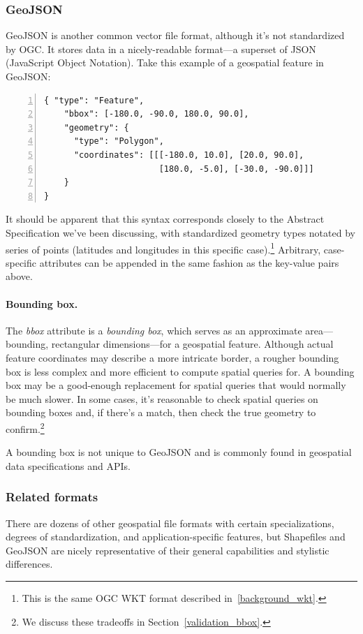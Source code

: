 \subsubsection{GeoJSON}
GeoJSON is another common vector file format, although it's not standardized by OGC. It stores data in a nicely-readable format---a superset of JSON (JavaScript Object Notation). Take this example of a geospatial feature in GeoJSON:

\begin{Verbatim}[samepage=true,baselinestretch=1,numbers=left,xleftmargin=12mm]
{ "type": "Feature",
    "bbox": [-180.0, -90.0, 180.0, 90.0],
    "geometry": {
      "type": "Polygon",
      "coordinates": [[[-180.0, 10.0], [20.0, 90.0],
                       [180.0, -5.0], [-30.0, -90.0]]]
    }
}
\end{Verbatim}

It should be apparent that this syntax corresponds closely to the Abstract Specification we've been discussing, with standardized geometry types notated by series of points (latitudes and longitudes in this specific case).\footnote{This is the same OGC WKT format described in~\ref{background_wkt}.} Arbitrary, case-specific attributes can be appended in the same fashion as the key-value pairs above.

\paragraph{Bounding box.}
The \textit{bbox} attribute is a \textit{bounding box}, which serves as an approximate area---bounding, rectangular dimensions---for a geospatial feature. Although actual feature coordinates may describe a more intricate border, a rougher bounding box is less complex and more efficient to compute spatial queries for. A bounding box may be a good-enough replacement for spatial queries that would normally be much slower. In some cases, it's reasonable to check spatial queries on bounding boxes and, if there's a match, then check the true geometry to confirm.\footnote{We discuss these tradeoffs in Section~\ref{validation_bbox}.}

A bounding box is not unique to GeoJSON and is commonly found in geospatial data specifications and APIs.

\subsubsection{Related formats}
There are dozens of other geospatial file formats with certain specializations, degrees of standardization, and application-specific features, but Shapefiles and GeoJSON are nicely representative of their general capabilities and stylistic differences.